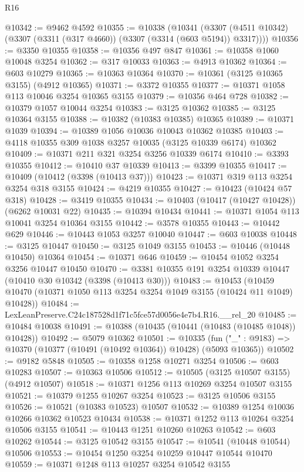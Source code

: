 \begin{lexlean}{R16}
\begin{coremodule}
@10342 := @9462 @4592
@10355 := @10338
    (@10341 (@3307 (@4511 @10342) (@3307 (@3311 (@317 @4660)) (@3307 (@3314 (@603 @5194)) @3317))))
@10356 := @3350 @10355
@10358 := @10356 @497 @847
@10361 := @10358 @1060 @10048 @3254
@10362 := @317 @10033
@10363 := @4913 @10362
@10364 := @603 @10279
@10365 := @10363 @10364
@10370 := @10361 (@3125 @10365 @3155) (@4912 @10365)
@10371 := @3372 @10355
@10377 := @10371 @1058 @113 @10046 @3254 @10365 @3155
@10379 := @10356 @464 @728
@10382 := @10379 @1057 @10044 @3254
@10383 := @3125 @10362
@10385 := @3125 @10364 @3155
@10388 := @10382 (@10383 @10385) @10365
@10389 := @10371 @1039
@10394 := @10389 @1056 @10036 @10043 @10362 @10385
@10403 := @4118 @10355 @309 @1038 @3257 @10035 (@3125 @10339 @6174) @10362
@10409 := @10371 @211 @321 @3254 @3256 @10339 @6174
@10410 := @3393 @10355
@10412 := @10410 @37 @10339
@10413 := @3399 @10355
@10417 := @10409 (@10412 (@3398 (@10413 @37)))
@10423 := @10371 @319 @113 @3254 @3254 @318 @3155
@10424 := @4219 @10355
@10427 := @10423 (@10424 @57 @318)
@10428 := @3419 @10355
@10434 := @10403 (@10417 (@10427 @10428)) (@6262 @10031 @22)
@10435 := @10394 @10434
@10441 := @10371 @1054 @113 @10041 @3254 @10364 @3155
@10442 := @3578 @10355
@10443 := @10442 @629
@10446 := @10443 @1053 @3257 @10040
@10447 := @603 @10038
@10448 := @3125 @10447
@10450 := @3125 @1049 @3155
@10453 := @10446 (@10448 @10450) @10364
@10454 := @10371 @646
@10459 := @10454 @1052 @3254 @3256 @10447 @10450
@10470 := @3381 @10355 @191 @3254 @10339 @10447 (@10410 @30 @10342 (@3398 (@10413 @30)))
@10483 := @10453
    (@10459 @10470 (@10371 @1050 @113 @3254 @3254 @1049 @3155 (@10424 @11 @1049) @10428))
@10484 := LexLeanPreserve.C24c187528d1f71c5fce57d0056e4e7b4.R16.__rel_20
@10485 := @10484 @10038
@10491 := @10388 (@10435 (@10441 (@10483 (@10485 @1048)) @10428))
@10492 := @5079 @10362
@10501 := @10335
    (fun ("_" : @9183) => @10370 (@10377 (@10491 (@10492 @10364)) @10428) (@5093 @10365))
@10502 := @9182 @5848
@10505 := @10358 @1258 @10271 @3254
@10506 := @603 @10283
@10507 := @10363 @10506
@10512 := @10505 (@3125 @10507 @3155) (@4912 @10507)
@10518 := @10371 @1256 @113 @10269 @3254 @10507 @3155
@10521 := @10379 @1255 @10267 @3254
@10523 := @3125 @10506 @3155
@10526 := @10521 (@10383 @10523) @10507
@10532 := @10389 @1254 @10036 @10266 @10362 @10523 @10434
@10538 := @10371 @1252 @113 @10264 @3254 @10506 @3155
@10541 := @10443 @1251 @10260 @10263
@10542 := @603 @10262
@10544 := @3125 @10542 @3155
@10547 := @10541 (@10448 @10544) @10506
@10553 := @10454 @1250 @3254 @10259 @10447 @10544 @10470
@10559 := @10371 @1248 @113 @10257 @3254 @10542 @3155

\end{coremodule}
\end{lexlean}
